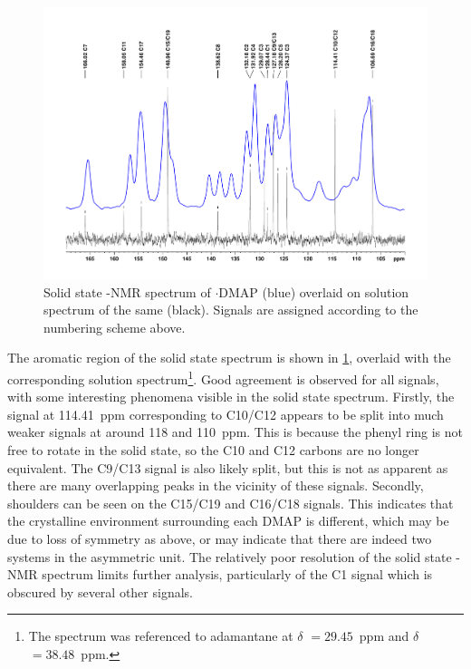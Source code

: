 \begin{refsection}
\begin{figure}
  \includegraphics[width=\linewidth]{Figures/ebs-4ome-dmap-cpmas-sol-13c.pdf}
  \caption[Solid state -NMR spectrum of $ \cdot $DMAP.]{Solid state -NMR spectrum of $ \cdot $DMAP (blue) overlaid on solution spectrum of the same (black). Signals are assigned according to the numbering scheme above.}\label{fig:cpmas-sol-13c}
\end{figure}

The aromatic region of the solid state  spectrum is shown in \cref{fig:cpmas-sol-13c}, overlaid with the corresponding solution spectrum\footnote{The  spectrum was referenced to adamantane at $ \delta $ $= 29.45$~ppm and $ \delta $ $= 38.48$~ppm.\autocite{Morcombe2003}}.
Good agreement is observed for all signals, with some interesting phenomena visible in the solid state spectrum.
Firstly, the signal at 114.41~ppm corresponding to C10/C12 appears to be split into much weaker signals at around 118 and 110~ppm.
This is because the phenyl ring is not free to rotate in the solid state, so the C10 and C12 carbons are no longer equivalent.
The C9/C13 signal is also likely split, but this is not as apparent as there are many overlapping peaks in the vicinity of these signals.
Secondly, shoulders can be seen on the C15/C19 and C16/C18 signals.
This indicates that the crystalline environment surrounding each DMAP is different, which may be due to loss of symmetry as above, or may indicate that there are indeed two systems in the asymmetric unit.
The relatively poor resolution of the solid state -NMR spectrum limits further analysis, particularly of the C1 signal which is obscured by several other signals.


\end{refsection}
